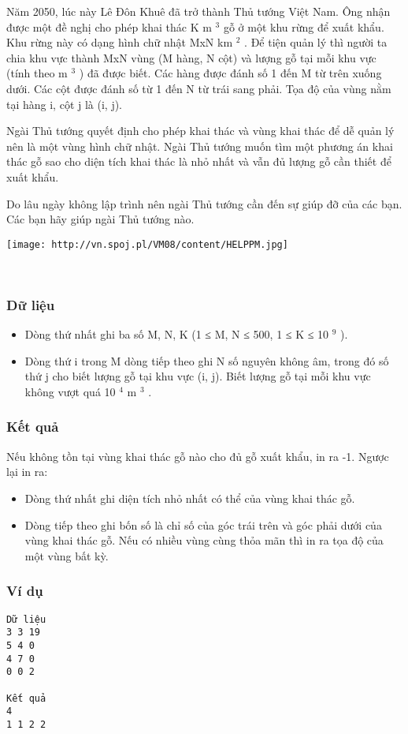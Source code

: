 

Năm 2050, lúc này Lê Đôn Khuê đã trở thành Thủ tướng Việt Nam. Ông nhận được một đề nghị cho phép khai thác K m $^ 3 $ gỗ ở một khu rừng để xuất khẩu. Khu rừng này có dạng hình chữ nhật MxN km $^ 2 $ . Để tiện quản lý thì người ta chia khu vực thành MxN vùng (M hàng, N cột) và lượng gỗ tại mỗi khu vực (tính theo m $^ 3 $ ) đã được biết. Các hàng được đánh số 1 đến M từ trên xuống dưới. Các cột được đánh số từ 1 đến N từ trái sang phải. Tọa độ của vùng nằm tại hàng i, cột j là (i, j).

Ngài Thủ tướng quyết định cho phép khai thác và vùng khai thác để dễ quản lý nên là một vùng hình chữ nhật. Ngài Thủ tướng muốn tìm một phương án khai thác gỗ sao cho diện tích khai thác là nhỏ nhất và vẫn đủ lượng gỗ cần thiết để xuất khẩu.

Do lâu ngày không lập trình nên ngài Thủ tướng cần đến sự giúp đỡ của các bạn. Các bạn hãy giúp ngài Thủ tướng nào.


\texttt{[image: http://vn.spoj.pl/VM08/content/HELPPM.jpg]}

 

\subsubsection{Dữ liệu}
\begin{itemize}
	\item Dòng thứ nhất ghi ba số M, N, K (1 ≤ M, N ≤ 500, 1 ≤ K ≤ 10 $^ 9 $ ).
	\item Dòng thứ i trong M dòng tiếp theo ghi N số nguyên không âm, trong đó số thứ j cho biết lượng gỗ tại khu vực (i, j). Biết lượng gỗ tại mỗi khu vực không vượt quá 10 $^ 4 $ m $^ 3 $ .
\end{itemize}

\subsubsection{Kết quả}

Nếu không tồn tại vùng khai thác gỗ nào cho đủ gỗ xuất khẩu, in ra -1. Ngược lại in ra:
\begin{itemize}
	\item Dòng thứ nhất ghi diện tích nhỏ nhất có thể của vùng khai thác gỗ.
	\item Dòng tiếp theo ghi bốn số là chỉ số của góc trái trên và góc phải dưới của vùng khai thác gỗ. Nếu có nhiều vùng cùng thỏa mãn thì in ra tọa độ của một vùng bất kỳ.
\end{itemize}

\subsubsection{Ví dụ}
\begin{verbatim}
Dữ liệu
3 3 19
5 4 0
4 7 0
0 0 2

Kết quả
4
1 1 2 2
\end{verbatim}